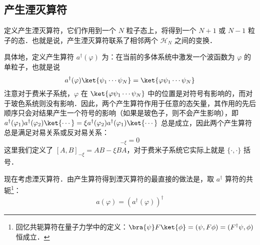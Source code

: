 \subsection{产生湮灭算符}
定义产生湮灭算符，它们作用到一个 $N$ 粒子态上，将得到一个 $N+1$ 或 $N-1$ 粒子的态．也就是说，产生湮灭算符联系了相邻两个 $\mathcal{H}_N$ 之间的变换．

具体地，定义产生算符 $a^\dagger(\varphi)$ 为：在当前的多体系统中激发一个波函数为 $\varphi$ 的单粒子，也就是说
\begin{equation}
a^\dagger(\varphi)\ket{\psi_1\cdots\psi_N}=\ket{\varphi\psi_1\cdots\psi_N}
\end{equation}
注意对于费米子系统，$\varphi$ 在 $\ket{\varphi\psi_1\cdots\psi_N}$ 中的位置是对符号有影响的，而对于玻色系统则没有影响．因此，两个产生算符作用于任意的态矢量，其作用的先后顺序只会对结果产生一个符号的影响（如果是玻色子，则不会产生影响），即 $a^\dagger(\varphi_1)a^\dagger(\varphi_2)\ket{\cdots}=\xi a^\dagger(\varphi_2)a^\dagger(\varphi_1)\ket{\cdots}$ 总是成立，因此两个产生算符总是满足对易关系或反对易关系：
\begin{equation}
[a^\dagger(\varphi_1),a^\dagger(\varphi_2)]_{-\xi}=0
\end{equation}
这里我们定义了 $[A,B]_{-\xi}=AB-\xi BA$，对于费米子系统它实际上就是 $\{\cdot,\cdot \}$ 括号．

现在考虑湮灭算符．由产生算符得到湮灭算符的最直接的做法是，取 $a^\dagger$ 算符的共轭\footnote{回忆共轭算符在量子力学中的定义：$\bra{\psi}F\ket{\phi}=(\psi,F \phi)=(F^\dagger \psi,\phi)$ 恒成立．}：
\begin{equation}
a(\varphi)=(a^\dagger(\varphi))^\dagger
\end{equation}
